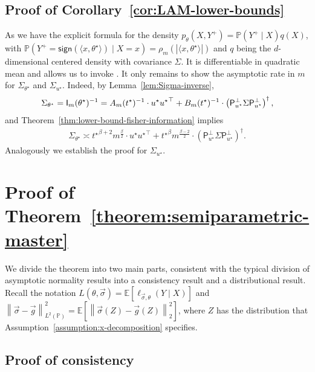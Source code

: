 \documentclass[11pt]{article}
\newcommand{\E}{\mathbb{E}}
\newcommand{\Prb}{\mathbb{P}}
\newcommand{\prn}[1]{\left({#1}\right)} %
\newcommand{\norm}[1]{\left\|{#1}\right\|} %
\newcommand{\majY}{Y^+}
\newcommand{\sgn}{\mathsf{sign}}
\newcommand{\proj}{\mathsf{P}}
\newcommand{\loss}{\ell}
\newcommand{\ltwo}[1]{\norm{#1}_2} %
\newcommand{\<}{\langle} %
\renewcommand{\>}{\rangle}
\newcommand{\LtwoP}[1]{\norm{#1}_{L^2(\Prb)}}
\newcommand{\opt}{^\star}
\begin{document}
\subsection{Proof of Corollary~\ref{cor:LAM-lower-bounds}} \label{proof:LAM-lower-bounds}
As we have the explicit formula for the density $p_\theta(X,\majY) = \Prb(\majY \mid X) q(X)$, with $\Prb(\majY = \sgn(\<x, \theta^\star\>) \mid X = x) = \rho_m(|\<x, \theta^\star\>|) $ and $q$ being the $d$-dimensional centered density with covariance $\Sigma$. It is differentiable in quadratic mean and allows us to invoke \citet[Thm.~8.9]{VanDerVaart98}. It only remains to show the asymptotic rate in $m$ for $\Sigma_{\theta\opt}$ and $\Sigma_{u\opt}$. Indeed, by Lemma~\ref{lem:Sigma-inverse},
\begin{align*}
	\Sigma_{\theta\opt} = \fisher_m(\theta\opt)^{-1} = A_m (t\opt)^{-1} \cdot u\opt {u\opt}^\top + B_m(t\opt)^{-1} \cdot \prn{\proj_{u\opt}^\perp \Sigma \proj_{u\opt}^\perp}^\dagger,
\end{align*}
and  Theorem~\ref{thm:lower-bound-fisher-information} implies
\begin{align*}
	\Sigma_{\theta\opt} \asymp {t\opt}^{\beta +2} m^{\frac{\beta}{2}} \cdot u\opt {u\opt}^\top +  {t\opt}^{\beta}m^{\frac{\beta-2}{2}}  \cdot \prn{\proj_{u\opt}^\perp \Sigma \proj_{u\opt}^\perp}^\dagger.
\end{align*}
Analogously we establish the proof for $\Sigma_{u\opt}$.

\section{Proof of Theorem~\ref{theorem:semiparametric-master}}
\label{proof:semiparametric-master}

We divide the theorem into two main parts, consistent with the typical
division of asymptotic normality results into a consistency result and a
distributional result. Recall the notation $L(\theta,
\vec{\sigma}) = \E[\loss_{\vec{\sigma},\theta}(Y \mid X)]$
and
$\LtwoP{\vec{\sigma} - \vec{g}}^2
= \E[\ltwo{\vec{\sigma}(Z) - \vec{g}(Z)}^2]$,
where $Z$ has the distribution
that Assumption~\ref{assumption:x-decomposition} specifies.

\subsection{Proof of consistency}
\end{document}
